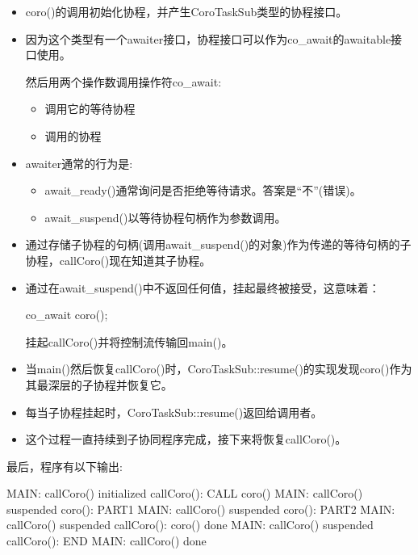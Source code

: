 \begin{itemize}
\item
coro()的调用初始化协程，并产生CoroTaskSub类型的协程接口。

\item
因为这个类型有一个awaiter接口，协程接口可以作为co\_await的awaitable接口使用。

然后用两个操作数调用操作符co\_await:

\begin{itemize}
\item
调用它的等待协程

\item
调用的协程
\end{itemize}

\item
awaiter通常的行为是:

\begin{itemize}
\item
await\_ready()通常询问是否拒绝等待请求。答案是“不”(错误)。

\item
await\_suspend()以等待协程句柄作为参数调用。
\end{itemize}

\item
通过存储子协程的句柄(调用await\_suspend()的对象)作为传递的等待句柄的子协程，callCoro()现在知道其子协程。

\item
通过在await\_suspend()中不返回任何值，挂起最终被接受，这意味着：

\begin{cpp}
co_await coro();
\end{cpp}

挂起callCoro()并将控制流传输回main()。

\item
当main()然后恢复callCoro()时，CoroTaskSub::resume()的实现发现coro()作为其最深层的子协程并恢复它。

\item
每当子协程挂起时，CoroTaskSub::resume()返回给调用者。

\item
这个过程一直持续到子协同程序完成，接下来将恢复callCoro()。
\end{itemize}

最后，程序有以下输出:

\begin{shell}
MAIN: callCoro() initialized
  callCoro(): CALL coro()
MAIN: callCoro() suspended
    coro(): PART1
MAIN: callCoro() suspended
    coro(): PART2
MAIN: callCoro() suspended
  callCoro(): coro() done
MAIN: callCoro() suspended
  callCoro(): END
MAIN: callCoro() done
\end{shell}

